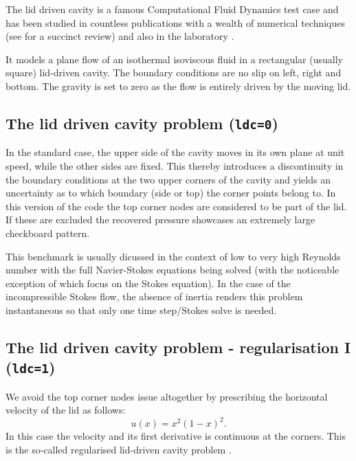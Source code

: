 
The lid driven cavity is a famous Computational Fluid Dynamics test case 
\cite{kawa61,ghgs82,paac67,bope98,brsa06,grdn97,shde00}
and has been studied in countless publications with a wealth of numerical techniques
(see \cite{ertu09} for a succinct review) and also in the laboratory \cite{kost84}.

It models a plane flow of an isothermal isoviscous fluid in a rectangular (usually square) lid-driven cavity. 
The boundary conditions are no slip on left, right and bottom. The gravity is set to zero as the flow
is entirely driven by the moving lid.

\subsection*{The lid driven cavity problem ({\tt ldc=0})}
In the standard case, the upper side of the cavity moves in its own plane at unit speed, while the other sides are fixed.
This thereby introduces a discontinuity in the boundary conditions at the two upper corners of the cavity and yields
an uncertainty as to which boundary (side or top) the corner points belong to. 
In this version of the code the top corner nodes are considered to be part of the lid. If these are excluded 
the recovered pressure showcases an extremely large checkboard pattern.

This benchmark is usually dicussed in the context of low to very high Reynolds number with the full 
Navier-Stokes equations being solved (with the noticeable exception of \cite{sagl81a,sagl81b,chpc95,eid2005}
which focus on the Stokes equation). 
In the case of the incompressible Stokes flow, 
the absence of inertia renders this problem instantaneous so that only one time step/Stokes solve is needed.

\subsection*{The lid driven cavity problem - regularisation I ({\tt ldc=1})}

We avoid the top corner nodes issue altogether by  
prescribing the horizontal velocity of the lid as follows: 
\begin{equation}
u(x)=x^2(1-x)^2.
\end{equation}
In this case the velocity and its first derivative is continuous at the corners. This is the so-called regularised lid-driven cavity problem \cite{piva94}.

